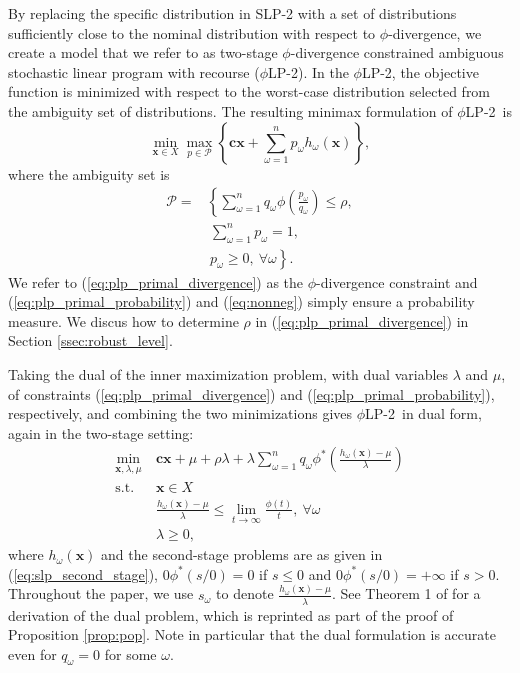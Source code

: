 \documentclass[ijoc,letterpaper]{informs3} %
\newcommand{\x}{\mathbf{x}}
\renewcommand{\c}{\mathbf{c}}
\newcommand{\st}{\mbox{s.t.}}
\newcommand{\plp}{$\phi$LP-2}
\begin{document}
By replacing the specific distribution in SLP-2 with a set of distributions sufficiently close to the nominal distribution with respect to $\phi$-divergence, we create a model that we refer to as two-stage $\phi$-divergence constrained ambiguous stochastic linear program with recourse (\plp).
In the \plp, the objective function is minimized with respect to the worst-case distribution selected from the ambiguity set of distributions.
The resulting minimax formulation of \plp\ is
\begin{equation}
	\min_{\x \in X} \max_{p \in \mathcal{P}} \left\{ \c\x + \sum_{\omega=1}^{n} p_\omega h_\omega(\x) \right\}, \label{eq:plp_primal}
\end{equation}
where the ambiguity set is
\begin{align}
	\mathcal{P} = & \left\{ \sum_{\omega = 1}^{n} q_\omega \phi\left(\frac{p_\omega}{q_\omega}\right) \leq \rho, \right. \label{eq:plp_primal_divergence} \\
	& \ \sum_{\omega=1}^{n} p_\omega = 1, \label{eq:plp_primal_probability} \\
	& \ \left. p_\omega \geq 0,\ \forall \omega \right\}. \label{eq:nonneg}
\end{align}
We refer to (\ref{eq:plp_primal_divergence}) as the $\phi$-divergence constraint and (\ref{eq:plp_primal_probability}) and (\ref{eq:nonneg}) simply ensure a probability measure.
We discus how to determine $\rho$ in (\ref{eq:plp_primal_divergence}) in Section \ref{ssec:robust_level}.

Taking the dual of the inner maximization problem, with dual variables $\lambda$ and $\mu$, of constraints (\ref{eq:plp_primal_divergence}) and (\ref{eq:plp_primal_probability}), respectively, and combining the two minimizations gives \plp\ in dual form, again in the two-stage setting:
\begin{align}
	\min_{\x,\lambda,\mu} \ & \c\x + \mu + \rho \lambda + \lambda \sum_{\omega=1}^{n} q_\omega \phi^*\left(\frac{h_\omega(\x) - \mu}{\lambda}\right) \label{eq:plp_two_stage} \\
	\st \ & \x \in X \nonumber \\
	& \frac{h_\omega(\x) - \mu}{\lambda} \leq \lim_{t \rightarrow \infty} \frac{\phi(t)}{t}, \ \forall \omega \label{eq:plp_feas_constraint}\\
	& \lambda \geq 0, \nonumber
\end{align}
where $h_\omega(\x)$ and the second-stage problems are as given in (\ref{eq:slp_second_stage}), $0\phi^*(s/0)=0$ if $s\leq 0$ and  $0\phi^*(s/0)=+\infty$ if $s > 0$.
Throughout the paper, we use $s_\omega$ to denote $\frac{h_\omega(\x) - \mu}{\lambda}$.  
See Theorem 1 of \cite{bental2011robust} for a derivation of the dual problem, which is reprinted as part of the proof of Proposition \ref{prop:pop}.
Note in particular that the dual formulation is accurate even for $q_\omega = 0$ for some $\omega$.
\end{document}

